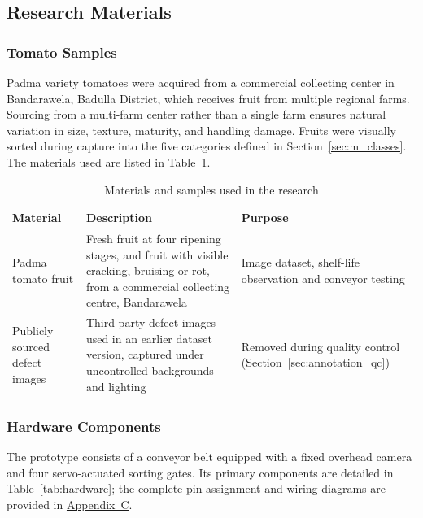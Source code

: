 \subsection{Research Materials}
\label{sec:m_materials}

\subsubsection{Tomato Samples}
\label{sec:m_samples}

Padma variety tomatoes were acquired from a commercial collecting center in Bandarawela, Badulla District, which receives fruit from multiple regional farms. Sourcing from a multi-farm center rather than a single farm ensures natural variation in size, texture, maturity, and handling damage. Fruits were visually sorted during capture into the five categories defined in Section~\ref{sec:m_classes}. The materials used are listed in Table~\ref{tab:materials}.

\begin{table}[H]
\caption{Materials and samples used in the research}
\label{tab:materials}
\centering
\begin{tabularx}{\textwidth}{p{3.1cm} X p{2.7cm}}
\toprule
\textbf{Material} & \textbf{Description} & \textbf{Purpose} \\
\midrule
Padma tomato fruit &
Fresh fruit at four ripening stages, and fruit with visible cracking, bruising or rot, from a commercial collecting centre, Bandarawela &
Image dataset, shelf-life observation and conveyor testing \\
\addlinespace
Publicly sourced defect images &
Third-party defect images used in an earlier dataset version, captured under uncontrolled backgrounds and lighting &
Removed during quality control (Section~\ref{sec:annotation_qc}) \\
\bottomrule
\end{tabularx}
\end{table}

\subsubsection{Hardware Components}
\label{sec:m_hardware}

The prototype consists of a conveyor belt equipped with a fixed overhead camera and four servo-actuated sorting gates. Its primary components are detailed in Table~\ref{tab:hardware}; the complete pin assignment and wiring diagrams are provided in \hyperref[app:C]{Appendix~C}.


